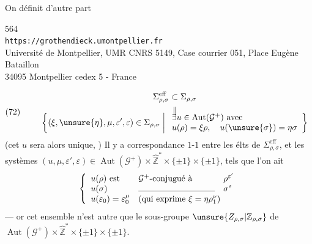On définit d'autre part


{\small
\begin{center}
564\\
\texttt{https://grothendieck.umontpellier.fr}\\
Université de Montpellier, UMR CNRS 5149, Case courrier 051, Place Eugène Bataillon\\
34095 Montpellier cedex 5 - France
\end{center}
}


\[
\text{(72)}\qquad
\begin{gathered}
\Sigma_{\rho,\sigma}^{\mathrm{eff}}\subset\Sigma_{\rho,\sigma}\\
\begin{array}{c}
\Vert\\[-0.4em]
\displaystyle\left\{(\xi,\unsure{\eta},\mu,\varepsilon',\varepsilon)\in\Sigma_{\rho,\sigma}\;\middle|\;
\begin{array}{l}
\exists u\in\operatorname{Aut}(\mathcal{G}^{+})\ \text{avec}\\
u(\rho)=\xi\rho,\quad u(\unsure{\sigma})=\eta\sigma
\end{array}\right\}
\end{array}
\end{gathered}
\]
(cet $u$ sera alors unique, ) Il y a correspondance $1$-$1$ entre les élts de $\Sigma_{\rho,\sigma}^{\mathrm{eff}}$, et les systèmes $(u,\mu,\varepsilon',\varepsilon)\in\operatorname{Aut}(\mathcal{G}^{+})\times\widehat{\mathbb Z}^{*}\times\{\pm1\}\times\{\pm1\}$, tels que l'on ait 
\[
\left\{\begin{array}{lll}
u(\rho)\text{ est}&\mathcal{G}^{+}\text{-conjugué à}&\rho^{\varepsilon'}\\
u(\sigma)&\rule{9em}{0.35pt}&\sigma^{\varepsilon}\\
u(\varepsilon_{0})=\varepsilon_{0}^{\mu}&\multicolumn{2}{l}{(\text{qui exprime }\xi=\eta\rho_{1}^{\nu})}
\end{array}\right.
\]
--- or cet ensemble n'est autre que le sous-groupe $\unsure{Z_{\rho,\sigma}|\mathbb Z_{\rho,\sigma}}$ de $\operatorname{Aut}(\mathcal{G}^{+})\times\widehat{\mathbb Z}^{*}\times\{\pm1\}\times\{\pm1\}$. 

